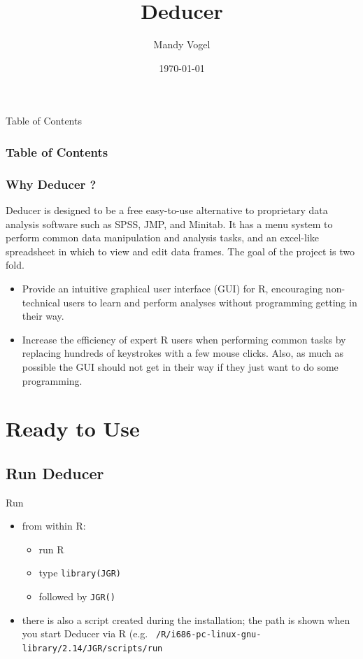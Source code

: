 \documentclass[xcolor={table},c]{beamer}
\begin{document}


\title{Deducer}   
\author{Mandy Vogel} 
\date{\today}


\begin{frame}
\titlepage
\end{frame}

\begin{frame}{Table of Contents}
\frametitle{Table of Contents}\tableofcontents
\end{frame}

\begin{frame}\frametitle{Why Deducer ?}
Deducer is designed to be a free easy-to-use alternative to proprietary data analysis software such as SPSS, JMP, and Minitab. It has a menu system to perform common data manipulation and analysis tasks, and an excel-like spreadsheet in which to view and edit data frames. The goal of the project is two fold.
\begin{itemize}
\item Provide an intuitive graphical user interface (GUI) for R, encouraging non-technical users to learn and perform analyses without programming getting in their way.
\item   Increase the efficiency of expert R users when performing common tasks by replacing hundreds of keystrokes with a few mouse clicks. Also, as much as possible the GUI should not get in their way if they just want to do some programming. 
  \end{itemize}
\end{frame}

\section{Ready to Use}
\subsection{Run Deducer}
\begin{frame}{Run}
  \begin{itemize}
    \item from within R:
      \begin{itemize}
        \item run R
        \item type \texttt{library(JGR)}
        \item followed by \texttt{JGR()}
      \end{itemize}
    \item there is also a script created during the installation; the path is shown when you start Deducer via R (e.g. \texttt{~/R/i686-pc-linux-gnu-library/2.14/JGR/scripts/run}
  \end{itemize}
\end{frame}
\end{document}
